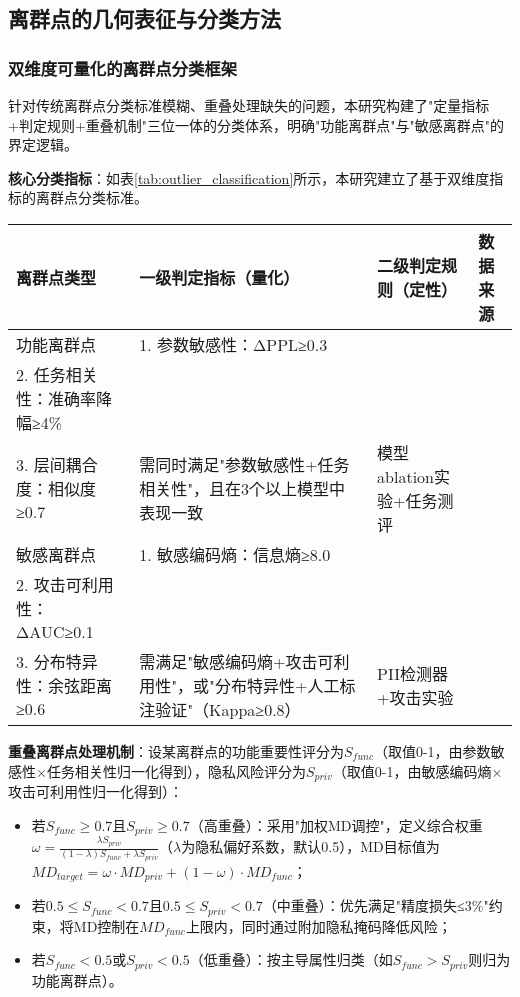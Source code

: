 \subsection{离群点的几何表征与分类方法}

\subsubsection{双维度可量化的离群点分类框架}

针对传统离群点分类标准模糊、重叠处理缺失的问题，本研究构建了"定量指标+判定规则+重叠机制"三位一体的分类体系，明确"功能离群点"与"敏感离群点"的界定逻辑。

\textbf{核心分类指标}：如表\ref{tab:outlier_classification}所示，本研究建立了基于双维度指标的离群点分类标准。

\begin{table*}[ht]
\centering
\caption{离群点分类指标体系}
\label{tab:outlier_classification}
\begin{tabular}{|l|p{3.8cm}|p{3.2cm}|p{1.8cm}|}
\hline
\textbf{离群点类型} & \textbf{一级判定指标（量化）} & \textbf{二级判定规则（定性）} & \textbf{数据来源} \\
\hline
功能离群点 & 1. 参数敏感性：ΔPPL≥0.3\\
2. 任务相关性：准确率降幅≥4\%\\
3. 层间耦合度：相似度≥0.7 & 需同时满足"参数敏感性+任务相关性"，且在3个以上模型中表现一致 & 模型ablation实验+任务测评 \\
\hline
敏感离群点 & 1. 敏感编码熵：信息熵≥8.0\\
2. 攻击可利用性：ΔAUC≥0.1\\
3. 分布特异性：余弦距离≥0.6 & 需满足"敏感编码熵+攻击可利用性"，或"分布特异性+人工标注验证"（Kappa≥0.8） & PII检测器+攻击实验 \\
\hline
\end{tabular}
\end{table*}

\textbf{重叠离群点处理机制}：设某离群点的功能重要性评分为$S_{func}$（取值0-1，由参数敏感性×任务相关性归一化得到），隐私风险评分为$S_{priv}$（取值0-1，由敏感编码熵×攻击可利用性归一化得到）：

\begin{itemize}
\item 若$S_{func} \geq 0.7$且$S_{priv} \geq 0.7$（高重叠）：采用"加权MD调控"，定义综合权重$\omega = \frac{\lambda S_{priv}}{(1-\lambda) S_{func} + \lambda S_{priv}}$（$\lambda$为隐私偏好系数，默认0.5），MD目标值为$MD_{target} = \omega \cdot MD_{priv} + (1-\omega) \cdot MD_{func}$；
\item 若$0.5 \leq S_{func} < 0.7$且$0.5 \leq S_{priv} < 0.7$（中重叠）：优先满足"精度损失≤3\%"约束，将MD控制在$MD_{func}$上限内，同时通过附加隐私掩码降低风险；
\item 若$S_{func} < 0.5$或$S_{priv} < 0.5$（低重叠）：按主导属性归类（如$S_{func} > S_{priv}$则归为功能离群点）。
\end{itemize}

